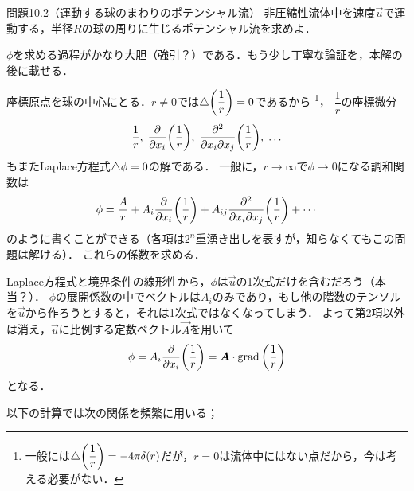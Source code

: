 
\begin{mondai}{}{問題10.2（運動する球のまわりのポテンシャル流）}
非圧縮性流体中を速度$\vec{u}$で運動する，半径$R$の球の周りに生じるポテンシャル流を求めよ．
\end{mondai}
\begin{kaitou}
\begin{details}
$\phi$を求める過程がかなり大胆（強引？）である．もう少し丁寧な論証を，本解の後に載せる．
\end{details}

座標原点を球の中心にとる．$r\neq0$では$\Laplacian\pqty{\dfrac{1}{r}}=0$であるから
\footnote{一般には$\Laplacian\pqty{\dfrac{1}{r}}=-4\pi\delta(r)$だが，$r=0$は流体中にはない点だから，今は考える必要がない．}，
$\dfrac{1}{r}$の座標微分
\[
    \frac{1}{r}, \; \pdv{x_i}\pqty{\frac{1}{r}}, \; \pdv{}{x_i}{x_j} \pqty{\frac{1}{r}}, \; \ldots
\]
もまたLaplace方程式$\triangle\phi=0$の解である．
一般に，$r\to\infty$で$\phi\to0$になる調和関数は
\[
    \phi = \frac{A}{r} + A_i \pdv{x_i}\pqty{\frac{1}{r}} + A_{ij} \pdv{}{x_i}{x_j} \pqty{\frac{1}{r}} + \cdots
\]
のように書くことができる（各項は$2^n$重湧き出しを表すが，知らなくてもこの問題は解ける）．
これらの係数を求める．

Laplace方程式と境界条件の線形性から，$\phi$は$\vec{u}$の1次式だけを含むだろう（本当？）．
$\phi$の展開係数の中でベクトルは$A_i$のみであり，もし他の階数のテンソルを$\vec{u}$から作ろうとすると，それは1次式ではなくなってしまう．
よって第2項以外は消え，$\vec{u}$に比例する定数ベクトル$\vec{A}$を用いて
\[
    \phi = A_i \pdv{x_i}\pqty{\frac{1}{r}} = \vec{A} \cdot \Grad \pqty{\frac{1}{r}}
\]
となる．
\begin{details}
以下の計算では次の関係を頻繁に用いる；


\end{details}
\end{kaitou}
